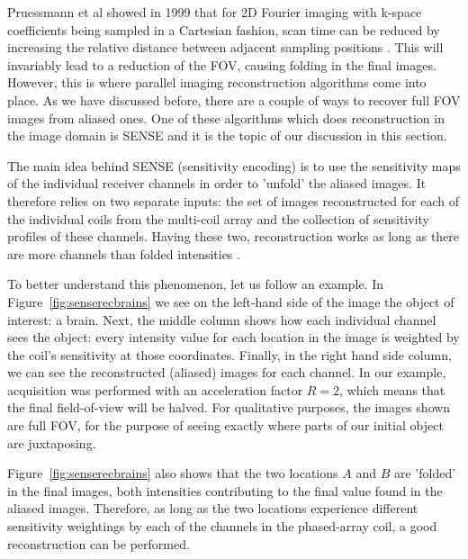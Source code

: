 Pruessmann et al showed in 1999 that for 2D Fourier imaging with k-space coefficients being sampled in a Cartesian fashion, scan time can be reduced by increasing the relative distance between adjacent sampling positions \cite{Pruessmann1999}. This will invariably lead to a reduction of the FOV, causing folding in the final images. However, this is where parallel imaging reconstruction algorithms come into place. As we have discussed before, there are a couple of ways to recover full FOV images from aliased ones. One of these algorithms which does reconstruction in the image domain is SENSE and it is the topic of our discussion in this section.

The main idea behind SENSE (sensitivity encoding) is to use the sensitivity maps of the individual receiver channels in order to 'unfold' the aliased images. It therefore relies on two separate inputs: the set of images reconstructed for each of the individual coils from the multi-coil array and the collection of sensitivity profiles of these channels. Having these two, reconstruction works as long as there are more channels than folded intensities \cite{Pruessmann1999}. 

To better understand this phenomenon, let us follow an example. In Figure~\ref{fig:senserecbrains} we see on the left-hand side of the image the object of interest: a brain. Next, the middle column shows how each individual channel sees the object: every intensity value for each location in the image is weighted by the coil's sensitivity at those coordinates. Finally, in the right hand side column, we can see the reconstructed (aliased) images for each channel. In our example, acquisition was performed with an acceleration factor $R = 2$, which means that the final field-of-view will be halved. For qualitative purposes, the images shown are full FOV, for the purpose of seeing exactly where parts of our initial object are juxtaposing.

Figure~\ref{fig:senserecbrains} also shows that the two locations $A$ and $B$ are 'folded' in the final images, both intensities contributing to the final value found in the aliased images. Therefore, as long as the two locations experience different sensitivity weightings by each of the channels in the phased-array coil, a good reconstruction can be performed.

